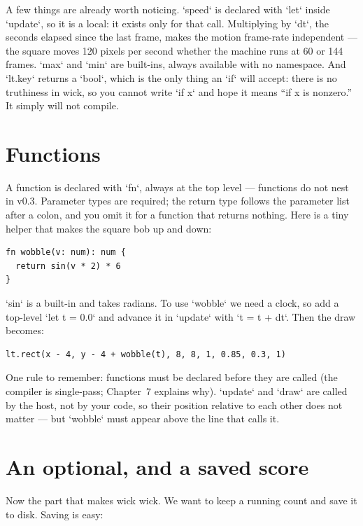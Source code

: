 \noindent
A few things are already worth noticing. `speed` is declared with `let`
inside `update`, so it is a local: it exists only for that call. Multiplying
by `dt`, the seconds elapsed since the last frame, makes the motion
frame-rate independent --- the square moves 120 pixels per second whether the
machine runs at 60 or 144 frames. `max` and `min` are built-ins, always
available with no namespace. And `lt.key` returns a `bool`, which is the only
thing an `if` will accept: there is no truthiness in wick, so you cannot
write `if x` and hope it means ``if x is nonzero.'' It simply will not
compile.

\section{Functions}

A function is declared with `fn`, always at the top level --- functions do not
nest in v0.3. Parameter types are required; the return type follows the
parameter list after a colon, and you omit it for a function that returns
nothing. Here is a tiny helper that makes the square bob up and down:

\begin{lstlisting}[language=wick]
fn wobble(v: num): num {
  return sin(v * 2) * 6
}
\end{lstlisting}

\noindent
`sin` is a built-in and takes radians. To use `wobble` we need a clock, so
add a top-level `let t = 0.0` and advance it in `update` with `t = t + dt`.
Then the draw becomes:

\begin{lstlisting}[language=wick]
lt.rect(x - 4, y - 4 + wobble(t), 8, 8, 1, 0.85, 0.3, 1)
\end{lstlisting}

\noindent
One rule to remember: functions must be declared before they are called
(the compiler is single-pass; Chapter~7 explains why). `update` and `draw`
are called by the host, not by your code, so their position relative to each
other does not matter --- but `wobble` must appear above the line that calls
it.

\section{An optional, and a saved score}

Now the part that makes wick wick. We want to keep a running count and save
it to disk. Saving is easy:

